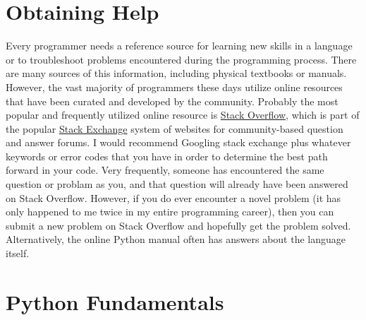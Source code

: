 \documentclass[a4paper,11pt]{article}
\begin{document}
\section{Obtaining Help}
Every programmer needs a reference source for learning new skills in a language or to troubleshoot 
problems encountered during the programming process.  There are many sources of this information, 
including physical textbooks or manuals.  However, the vast majority of programmers these days utilize 
online resources that have been curated and developed by the community.  Probably the most popular and 
frequently utilized online resource is \href{https://stackoverflow.com}{Stack Overflow}, which is part 
of the popular \href{https://stackexchange.com/}{Stack Exchange} system of websites for community-based 
question and answer forums.  I would recommend Googling stack exchange plus whatever keywords or error 
codes that you have in order to determine the best path forward in your code.  Very frequently, someone 
has encountered the same question or problam as you, and that question will already have been answered 
on Stack Overflow.  However, if you do ever encounter a novel problem (it has only happened to me twice 
in my entire programming career), then you can submit a new problem on Stack Overflow and hopefully get 
the problem solved.  Alternatively, the online Python manual often has answers about the language itself.

\pagebreak

\section{Python Fundamentals}
\end{document}
